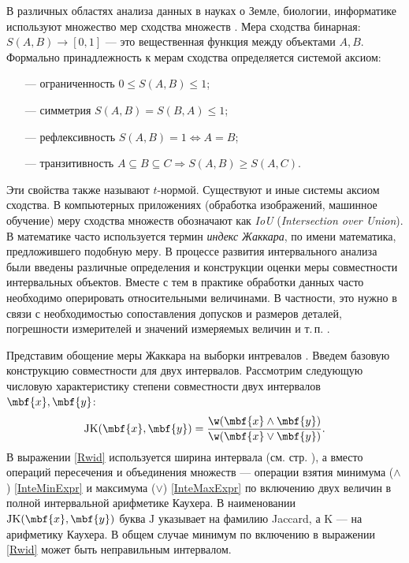 \documentclass[a5paper,openany]{book}
\begin{document}
В различных областях анализа данных в науках о Земле, биологии, информатике используют множество мер сходства множеств \cite{Jaccard}.  
Мера сходства бинарная: $S(A, B) \rightarrow [0, 1] $ --- это вещественная функция между объектами $A, B$. 
Формально  принадлежность к мерам сходства определяется системой аксиом:
\begin{itemize}
	\item[---] ограниченность $0 \leq 	S(A, B)  \leq 1 $;
	\item[---] симметрия $	S(A, B) = S(B,A)  \leq 1$;
	\item[---] рефлексивность $	S(A, B)=1  \Longleftrightarrow A=B $;
	\item[---] транзитивность $ 	A \subseteq B \subseteq C \Longrightarrow   S(A, B) \geq S(A, C)  $.
\end{itemize}
Эти свойства также называют $t$-нормой. Существуют и иные системы аксиом сходства.
   
В компьютерных приложениях (обработка изображений, машинное обучение) меру сходства множеств  обозначают как \emph{IoU} (\emph{Intersection over Union}). В математике часто используется термин \emph{индекс Жаккара}, по имени математика, предложившего подобную меру.
\label{JaccardMeasure}
В процессе развития интервального анализа были введены различные определения и конструкции оценки меры совместности интервальных объектов.
Вместе с тем в практике обработки данных часто необходимо оперировать относительными величинами. В частности, это нужно в связи с необходимостью сопоставления допусков и размеров деталей, погрешности измерителей и значений измеряемых величин и т.\,п. \cite{Kabir2017}.

Представим обощение меры Жаккара на выборки интревалов \cite{Jaccard2022}.
Введем базовую конструкцию совместности для двух интервалов.
Рассмотрим  следующую числовую характеристику степени совместности  двух интервалов $\mbf{x}, \mbf{y}$:
\begin{equation}\label{Rwid}
	\mathrm{JK}(\mbf{x}, \mbf{y}) = 
	\frac{\w (\mbf{x} \wedge \mbf{y} )}{\w (\mbf{x} \vee \mbf{y})}.
\end{equation}
В выражении \eqref{Rwid} используется ширина интервала (см. стр. \pageref{InteWid}), а вместо операций пересечения и объединения множеств --- операции взятия  минимума ($\wedge$) \eqref{InteMinExpr} и максимума ($\vee$) \eqref{InteMaxExpr} по включению двух величин в полной интервальной арифметике Каухера. В наименовании $\mathrm{JK}(\mbf{x}, \mbf{y})$ буква $\mathrm{J}$ указывает на фамилию 
Jaccard, а $\mathrm{K}$ --- на арифметику Каухера.
В общем случае минимум по включению в выражении \eqref{Rwid} может быть неправильным интервалом. 
\end{document}

